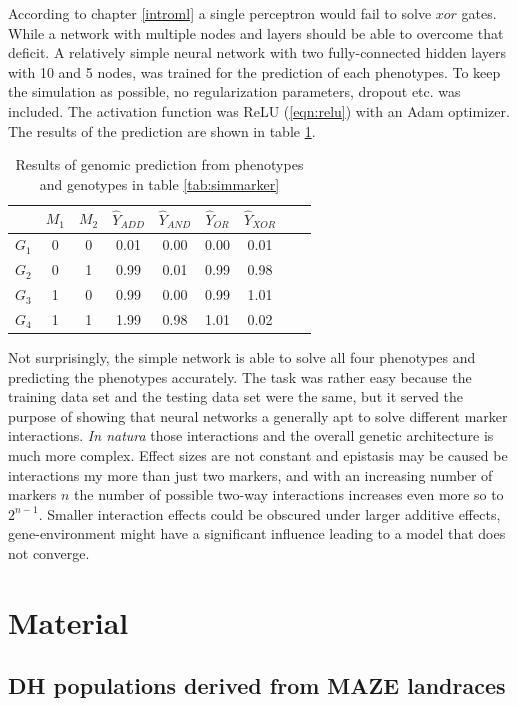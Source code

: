 According to chapter \ref{introml} a single perceptron would fail to solve $xor$ gates. While a network with multiple
nodes and layers should be able to overcome that deficit. A relatively simple neural network with two fully-connected
hidden layers with 10 and 5 nodes, was trained for the prediction of each phenotypes. To keep the simulation as
possible, no regularization parameters, dropout etc. was included. The activation function was ReLU (\ref{eqn:relu})
with an Adam optimizer. The results of the prediction are shown in table \ref{tab:simgpres}.

\begin{table}[H]
\caption{Results of genomic prediction from phenotypes and genotypes in table \ref{tab:simmarker}}
\label{tab:simgpres}
\centering
\begin{tabular}{ l c c | c c c c c c }
  \toprule
  & $M_1$ & $M_2$ & $\hat{Y}_{ADD}$ & $\hat{Y}_{AND}$ & $\hat{Y}_{OR}$ & $\hat{Y}_{XOR}$\\
  \midrule
  \hline 
  $G_1$ & 0 & 0 & 0.01 & 0.00 & 0.00 & 0.01 \\
  $G_2$ & 0 & 1 & 0.99 & 0.01 & 0.99 & 0.98 \\
  $G_3$ & 1 & 0 & 0.99 & 0.00 & 0.99 & 1.01 \\
  $G_4$ & 1 & 1 & 1.99 & 0.98 & 1.01 & 0.02 \\
  \bottomrule
\end{tabular}
\end{table}


Not surprisingly, the simple network is able to solve all four phenotypes and predicting the phenotypes accurately. The
task was rather easy because the training data set and the testing data set were the same, but it served the purpose of
showing that neural networks a generally apt to solve different marker interactions. \textit{In natura} those
interactions and the overall genetic architecture is much more complex. Effect sizes are not constant and epistasis may
be caused be interactions my more than just two markers, and with an increasing number of markers $n$ the number of
possible two-way interactions increases even more so to $2^{n-1}$. Smaller interaction effects could be obscured under
larger additive effects, gene-environment might have a significant influence leading to a model that does not converge.


\section{Material}
\subsection{DH populations derived from MAZE landraces}
